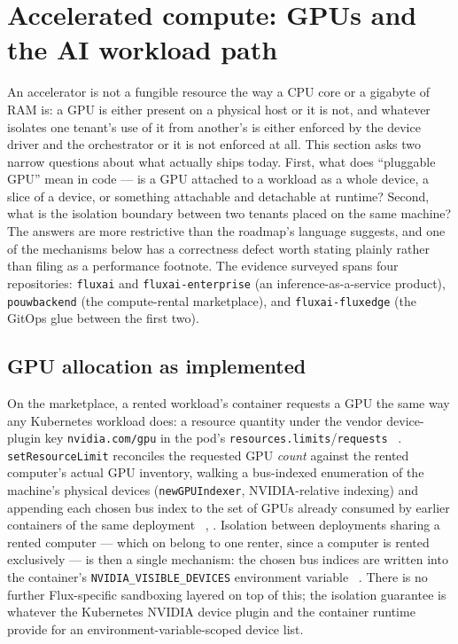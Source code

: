 \section{Accelerated compute: GPUs and the AI workload path}
\label{sec:accelerated-compute}

An accelerator is not a fungible resource the way a CPU core or a gigabyte of RAM is: a GPU is
either present on a physical host or it is not, and whatever isolates one tenant's use of it from
another's is either enforced by the device driver and the orchestrator or it is not enforced at
all. This section asks two narrow questions about what \Flux actually ships today. First, what does
``pluggable GPU'' mean in code — is a GPU attached to a workload as a whole device, a slice of a
device, or something attachable and detachable at runtime? Second, what is the isolation boundary
between two tenants placed on the same machine? The answers are more restrictive than the roadmap's
language suggests, and one of the mechanisms below has a correctness defect worth stating plainly
rather than filing as a performance footnote. The evidence surveyed spans four repositories:
\texttt{fluxai} and \texttt{fluxai-\allowbreak{}enterprise} (an inference-as-a-service product), \texttt{pouwbackend}
(the \FluxEdge compute-rental marketplace), and \texttt{fluxai-\allowbreak{}fluxedge} (the GitOps glue between the
first two).

\subsection{GPU allocation as implemented}
\label{sec:accelerated-compute-allocation}

On the \FluxEdge marketplace, a rented workload's container requests a GPU the same way any
Kubernetes workload does: a resource quantity under the vendor device-plugin key \texttt{nvidia.com/gpu}
in the pod's \texttt{resources.\allowbreak{}limits}\slash\texttt{requests} \shipped\ .
\texttt{set\allowbreak{}Resource\allowbreak{}Limit} reconciles the requested GPU \emph{count} against the rented computer's
actual GPU inventory, walking a bus-indexed enumeration of the machine's physical devices
(\texttt{newGPUIndexer}, NVIDIA-relative indexing) and appending each chosen bus index to the set of
GPUs already consumed by earlier containers of the same deployment \shipped\ ,
. Isolation between deployments sharing a rented
computer --- which on \FluxEdge belong to one renter, since a computer is rented exclusively
 --- is
then a single mechanism: the chosen bus indices are written into the container's
\texttt{NVIDIA\_VISIBLE\_DEVICES} environment variable \shipped\ .
There is no further Flux-specific sandboxing layered on top of this; the isolation guarantee is
whatever the Kubernetes NVIDIA device plugin and the container runtime provide for an
environment-variable-scoped device list.

